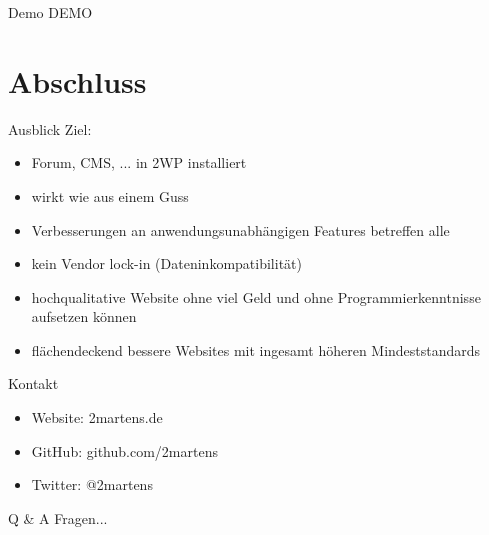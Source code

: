 \documentclass{beamer}
\begin{document}
\begin{frame}{Demo}
  \centering
  DEMO
\end{frame}

\section{Abschluss}
\begin{frame}{Ausblick}
  Ziel:
  \begin{itemize}
    \item Forum, CMS, ... in 2WP installiert
    \item wirkt wie aus einem Guss
    \item Verbesserungen an anwendungsunabhängigen Features betreffen alle
    \item kein Vendor lock-in (Dateninkompatibilität)
    \item hochqualitative Website ohne viel Geld und ohne Programmierkenntnisse aufsetzen können
    \item flächendeckend bessere Websites mit ingesamt höheren Mindeststandards
  \end{itemize}
\end{frame}

\begin{frame}{Kontakt}
  \begin{itemize}
    \item Website: 2martens.de
    \item GitHub: github.com/2martens
    \item Twitter: @2martens
  \end{itemize}
\end{frame}

\begin{frame}{Q \& A}
  \centering
  Fragen...
\end{frame}
\end{document}
